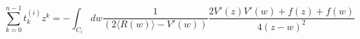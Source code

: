 \begin{equation}
\sum_{k=0}^{n-1} t^{(i)}_k z^k =- \int_{C_i}dw\frac{1}{(2 \langle R(w)
\rangle - 
V'(w))} \frac{2V'(z)V'(w)+f(z)+f(w)}
{4(z-w)^2} 
\end{equation}

